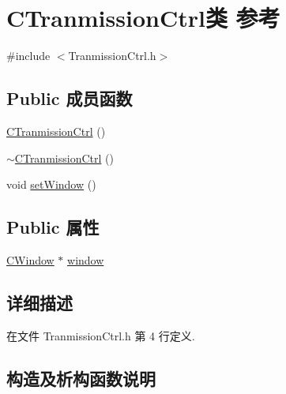 \hypertarget{class_c_tranmission_ctrl}{}\section{C\+Tranmission\+Ctrl类 参考}
\label{class_c_tranmission_ctrl}


{\ttfamily \#include $<$Tranmission\+Ctrl.\+h$>$}

\subsection*{Public 成员函数}
\begin{DoxyCompactItemize}
\item 
\hyperlink{class_c_tranmission_ctrl_ac6350691d2899d660e8fb4f2f6eaa12f}{C\+Tranmission\+Ctrl} ()
\item 
\hyperlink{class_c_tranmission_ctrl_a5dde68acc83557c551c449db31fb23dc}{$\sim$\+C\+Tranmission\+Ctrl} ()
\item 
void \hyperlink{class_c_tranmission_ctrl_a788cf64847e7345d6f82080a539431eb}{set\+Window} ()
\end{DoxyCompactItemize}
\subsection*{Public 属性}
\begin{DoxyCompactItemize}
\item 
\hyperlink{class_c_window}{C\+Window} $\ast$ \hyperlink{class_c_tranmission_ctrl_a78277227cfa57679025eaffe98b3807c}{window}
\end{DoxyCompactItemize}


\subsection{详细描述}


在文件 Tranmission\+Ctrl.\+h 第 4 行定义.



\subsection{构造及析构函数说明}
\mbox{\label{class_c_tranmission_ctrl_ac6350691d2899d660e8fb4f2f6eaa12f}} 
